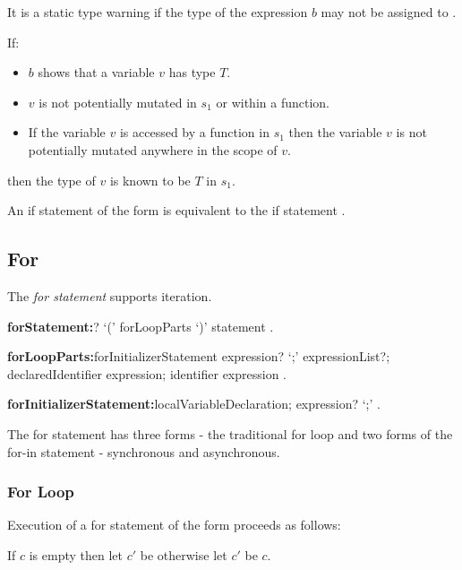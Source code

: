 \documentclass{article}
\begin{document}
\LMHash{}
It is a static type warning if the type of the expression $b$ may not be assigned to .

\LMHash{}
If:
\begin{itemize}
\item $b$ shows that a variable $v$ has type $T$.
\item $v$ is not potentially mutated in $s_1$ or within a function.
\item If the variable $v$ is accessed by a function in $s_1$ then the variable $v$ is not potentially mutated anywhere in the scope of $v$.
\end{itemize}
then the type of $v$ is known to be $T$ in $s_1$.

\LMHash{}
An if statement of the form  is equivalent to the if statement .


\subsection{For}

\LMHash{}
The {\em for statement} supports iteration.

\begin{grammar}
{\bf forStatement:}\AWAIT? \FOR{} `(' forLoopParts `)' statement
  .

{\bf forLoopParts:}forInitializerStatement expression? `{\escapegrammar ;}' expressionList?;
  declaredIdentifier \IN{} expression;
  identifier \IN{} expression
  .

{\bf forInitializerStatement:}localVariableDeclaration;
  expression? `{\escapegrammar ;}'
  .
\end{grammar}

\LMHash{}
 The for statement has three forms - the traditional for loop and two forms of the for-in statement - synchronous and asynchronous.


\subsubsection{For Loop}

\LMHash{}
Execution of a for statement of the form  proceeds as follows:

\LMHash{}
If $c$ is empty then let $c'$ be \TRUE{} otherwise let $c'$ be $c$.
\end{document}
